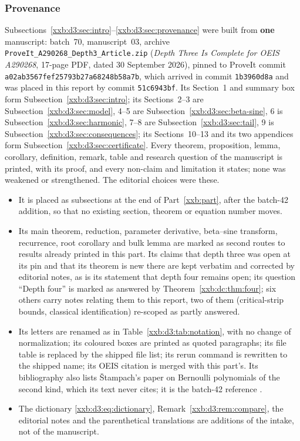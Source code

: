 \documentclass[11pt,a4paper]{article}
\numberwithin{equation}{section}
\theoremstyle{definition}
\theoremstyle{remark}
\theoremstyle{plain}
\begin{document}
\subsubsection{Provenance}
Subsections~\ref{xxb:d3:sec:intro}--\ref{xxb:d3:sec:provenance} were built from
\textbf{one} manuscript: batch~70, manuscript~03, archive
\texttt{ProveIt\_\allowbreak A290268\_\allowbreak Depth3\_\allowbreak Article.zip} (\emph{Depth Three Is Complete
for OEIS A290268}, 17-page PDF, dated 30 September 2026), pinned to ProveIt
commit \texttt{a02ab3567fef2579\allowbreak 3b27a68248b58a7b}, which arrived in
commit \texttt{1b3960d8a} and was placed in this report by commit
\texttt{51c6943bf}.  Its Section~1 and summary box form
Subsection~\ref{xxb:d3:sec:intro}; its Sections~2--3 are
Subsection~\ref{xxb:d3:sec:model}, 4--5 are
Subsection~\ref{xxb:d3:sec:beta-sine}, 6 is
Subsection~\ref{xxb:d3:sec:harmonic}, 7--8 are
Subsection~\ref{xxb:d3:sec:tail}, 9 is
Subsection~\ref{xxb:d3:sec:consequences}; its Sections~10--13 and its two
appendices form Subsection~\ref{xxb:d3:sec:certificate}.  Every theorem,
proposition, lemma, corollary, definition, remark, table and research question
of the manuscript is printed, with its proof, and every non-claim and
limitation it states; none was weakened or strengthened.  The editorial
choices were these.
\begin{itemize}[leftmargin=1.4em,itemsep=1pt]
\item It is placed as subsections at the end of Part~\ref{xxb:part}, after the
 batch-42 addition, so that no existing section, theorem or equation number
 moves.
\item Its main theorem, reduction, parameter derivative, beta--sine transform,
 recurrence, root corollary and bulk lemma are marked as second routes to
 results already printed in this part.  Its claims that depth three was open
 at its pin and that its theorem is new there are kept verbatim and corrected
 by editorial notes, as is its statement that depth four remains open; its
 question ``Depth four'' is marked as answered by
 Theorem~\ref{xxb:dc:thm:four}; six others carry notes relating them to
 this report, two of them (critical-strip bounds, classical identification)
 re-scoped as partly answered.
\item Its letters are renamed as in Table~\ref{xxb:d3:tab:notation}, with no
 change of normalization; its coloured boxes are printed as quoted paragraphs;
 its file table is replaced by the shipped file list; its rerun command is
 rewritten to the shipped name; its OEIS citation is merged with this part's.
 Its bibliography also lists \v{S}tampach's paper on Bernoulli polynomials of
 the second kind, which its text never cites; it is the
 batch-42 reference \cite{xxbdc-stampach}.
\item The dictionary \eqref{xxb:d3:eq:dictionary},
 Remark~\ref{xxb:d3:rem:compare}, the editorial notes and the parenthetical
 translations are additions of the intake, not of the manuscript.
\end{itemize}
\end{document}
